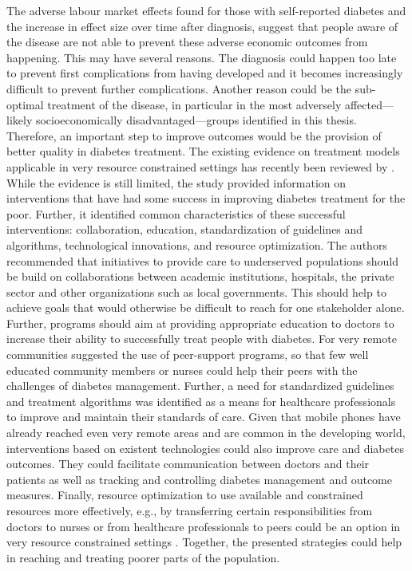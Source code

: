 The adverse labour market effects found for those with self-reported diabetes and the increase in effect size over time after diagnosis, suggest that people aware of the disease are not able to prevent these adverse economic outcomes from happening. This may have several reasons. The diagnosis could happen too late to prevent first complications from having developed and it becomes increasingly difficult to prevent further complications. Another reason could be the sub-optimal treatment of the disease, in particular in the most adversely affected---likely socioeconomically disadvantaged---groups identified in this thesis.
Therefore, an important step to improve outcomes would be the provision of better quality in diabetes treatment. The existing evidence on treatment models applicable in very resource constrained settings has recently been reviewed by \textcite{Esterson2014}. While the evidence is still limited, the study provided information on interventions that have had some success in improving diabetes treatment for the poor. Further, it identified common characteristics of these successful interventions: collaboration, education, standardization of guidelines and algorithms, technological innovations, and resource optimization. The authors recommended that initiatives to provide care to underserved populations should be build on collaborations between academic institutions, hospitals, the private sector and other organizations such as local governments. This should help to achieve goals that would otherwise be difficult to reach for one stakeholder alone. Further, programs should aim at providing appropriate education to doctors to increase their ability to successfully treat people with diabetes. For very remote communities \textcite{Esterson2014} suggested the use of peer-support programs, so that few well educated community members or nurses could help their peers with the challenges of diabetes management. Further, a need for standardized guidelines and treatment algorithms was identified as a means for healthcare professionals to improve and maintain their standards of care. Given that mobile phones have already reached even very remote areas and are common in the developing world, interventions based on existent technologies could also improve care and diabetes outcomes. They could facilitate communication between doctors and their patients as well as tracking and controlling diabetes management and outcome measures. Finally, resource optimization to use available and constrained resources more effectively, e.g., by transferring certain responsibilities from doctors to nurses or from healthcare professionals to peers could be an option in very resource constrained settings \parencite{Esterson2014}. Together, the presented strategies could help in reaching and treating poorer parts of the population.

